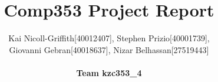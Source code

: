 \documentclass[11pt,letterpaper]{article}
\title{Comp353 Project Report}
\author{Kai Nicoll-Griffith[40012407], Stephen Prizio[40001739], \\Giovanni Gebran[40018637], Nizar Belhassan[27519443]\\\\\bf{Team kzc353\_4}}
\begin{document}
	
	

	\begin{titlepage}

\end{titlepage}
	
		\maketitle
		\newcommand{\graphicwidth}{18.5cm}
\end{document}
